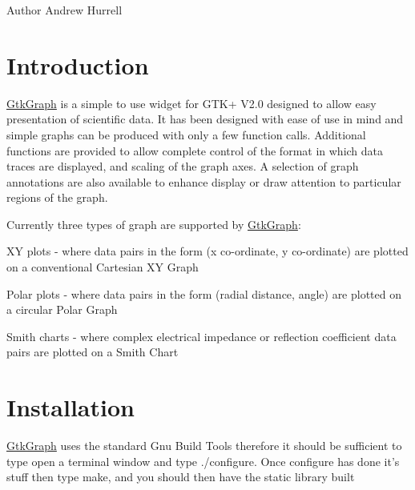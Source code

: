 \begin{DoxyAuthor}{Author}
Andrew Hurrell
\end{DoxyAuthor}
\hypertarget{index_intro_sec}{}\section{Introduction}\label{index_intro_sec}
\hyperlink{struct_gtk_graph}{GtkGraph} is a simple to use widget for GTK+ V2.0 designed to allow easy presentation of scientific data. It has been designed with ease of use in mind and simple graphs can be produced with only a few function calls. Additional functions are provided to allow complete control of the format in which data traces are displayed, and scaling of the graph axes. A selection of graph annotations are also available to enhance display or draw attention to particular regions of the graph.

Currently three types of graph are supported by \hyperlink{struct_gtk_graph}{GtkGraph}:

XY plots -\/ where data pairs in the form (x co-\/ordinate, y co-\/ordinate) are plotted on a conventional Cartesian XY Graph

Polar plots -\/ where data pairs in the form (radial distance, angle) are plotted on a circular Polar Graph

Smith charts -\/ where complex electrical impedance or reflection coefficient data pairs are plotted on a Smith Chart\hypertarget{index_install_sec}{}\section{Installation}\label{index_install_sec}
\hyperlink{struct_gtk_graph}{GtkGraph} uses the standard Gnu Build Tools therefore it should be sufficient to type open a terminal window and type ./configure. Once configure has done it's stuff then type make, and you should then have the static library built 
